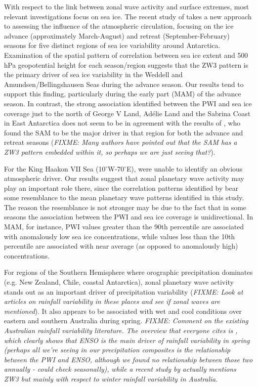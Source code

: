 With respect to the link between zonal wave activity and surface extremes, most relevant investigations focus on sea ice. The recent study of \citet{Raphael2014} takes a new approach to assessing the influence of the atmospheric circulation, focusing on the ice advance (approximately March-August) and retreat (September-February) seasons for five distinct regions of sea ice variability around Antarctica. Examination of the spatial pattern of correlation between sea ice extent and 500 hPa geopotential height for each season/region suggests that the ZW3 pattern is the primary driver of sea ice variability in the Weddell and Amundsen/Bellingshausen Seas during the advance season. Our results tend to support this finding, particularly during the early part (MAM) of the advance season. In contrast, the strong association identified between the PWI and sea ice coverage just to the north of George V Land, Ad{\'e}lie Land and the Sabrina Coast in East Antarctica does not seem to be in agreement with the results of \citet{Raphael2014}, who found the SAM to be the major driver in that region for both the advance and retreat seasons (\textit{FIXME: Many authors have pointed out that the SAM has a ZW3 pattern embedded within it, so perhaps we are just seeing that?}). 

For the King Haakon VII Sea (10$^{\circ}$W-70$^{\circ}$E), \citet{Raphael2014} were unable to identify an obvious atmospheric driver. Our results suggest that zonal planetary wave activity may play an important role there, since the correlation patterns identified by \citet{Raphael2014} bear some resemblance to the mean planetary wave patterns identified in this study. The reason the resemblance is not stronger may be due to the fact that in some seasons the association between the PWI and sea ice coverage is unidirectional. In MAM, for instance, PWI values greater than the 90th percentile are associated with anomalously low sea ice concentrations, while values less than the 10th percentile are associated with near average (as opposed to anomalously high) concentrations.

For regions of the Southern Hemisphere where orographic precipitation dominates (e.g. New Zealand, Chile, coastal Antarctica), zonal planetary wave activity stands out as an important driver of precipitation variability (\textit{FIXME: Look at articles on rainfall variability in these places and see if zonal waves are mentioned}). It also appears to be associated with wet and cool conditions over eastern and southern Australia during spring. \textit{FIXME: Comment on the existing Australian rainfall variability literature. The overview that everyone cites is \citet{Risbey2009}, which clearly shows that ENSO is the main driver of rainfall variability in spring (perhaps all we're seeing in our precipitation composites is the relationship between the PWI and ENSO, although we found no relationship between those two annually - could check seasonally), while a recent study by \citet{Frederiksen2014} actually mentions ZW3 but mainly with respect to winter rainfall variability in Australia.}

